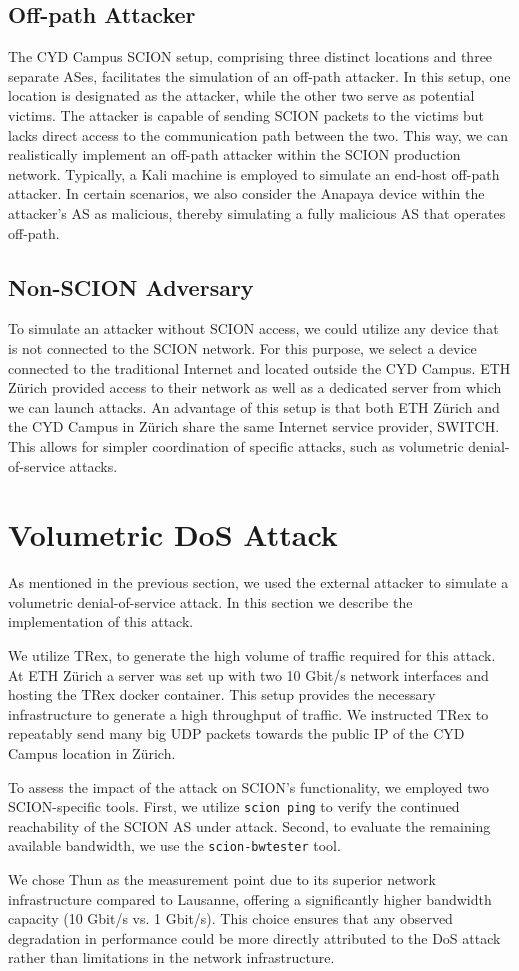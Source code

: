 \subsection{Off-path Attacker}

The CYD Campus SCION setup, comprising three distinct locations and three separate ASes, facilitates the simulation of an off-path attacker.
In this setup, one location is designated as the attacker, while the other two serve as potential victims.
The attacker is capable of sending SCION packets to the victims but lacks direct access to the communication path between the two.
This way, we can realistically implement an off-path attacker within the SCION production network.
Typically, a Kali machine is employed to simulate an end-host off-path attacker.
In certain scenarios, we also consider the Anapaya device within the attacker's AS as malicious, thereby simulating a fully malicious AS that operates off-path.

\subsection{Non-SCION Adversary}
To simulate an attacker without SCION access, we could utilize any device that is not connected to the SCION network.
For this purpose, we select a device connected to the traditional Internet and located outside the CYD Campus.
ETH Zürich provided access to their network as well as a dedicated server from which we can launch attacks.
An advantage of this setup is that both ETH Zürich and the CYD Campus in Zürich share the same Internet service provider, SWITCH.
This allows for simpler coordination of specific attacks, such as volumetric denial-of-service attacks.


\section{Volumetric DoS Attack}
\label{sec:impl:VolumetricDoS}
As mentioned in the previous section, we used the external attacker to simulate a volumetric denial-of-service attack.
In this section we describe the implementation of this attack.

We utilize TRex, to generate the high volume of traffic required for this attack.
At ETH Zürich a server was set up with two 10 Gbit/s network interfaces and hosting the TRex docker container.
This setup provides the necessary infrastructure to generate a high throughput of traffic.
We instructed TRex to repeatably send many big UDP packets towards the public IP of the CYD Campus location in Zürich.

To assess the impact of the attack on SCION's functionality, we employed two SCION-specific tools.
First, we utilize \texttt{scion ping} to verify the continued reachability of the SCION AS under attack.
Second, to evaluate the remaining available bandwidth, we use the \texttt{scion-bwtester} tool.

We chose Thun as the measurement point due to its superior network infrastructure compared to Lausanne, offering a significantly higher bandwidth capacity (10 Gbit/s vs. 1 Gbit/s).
This choice ensures that any observed degradation in performance could be more directly attributed to the DoS attack rather than limitations in the network infrastructure.